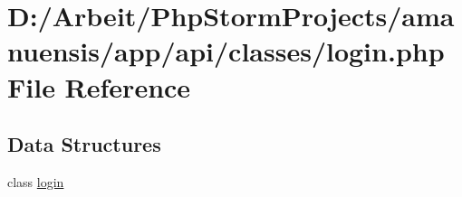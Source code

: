 \hypertarget{login_8php}{}\section{D\+:/\+Arbeit/\+Php\+Storm\+Projects/amanuensis/app/api/classes/login.php File Reference}
\label{login_8php}
\subsection*{Data Structures}
\begin{DoxyCompactItemize}
\item 
class \hyperlink{classlogin}{login}
\end{DoxyCompactItemize}
